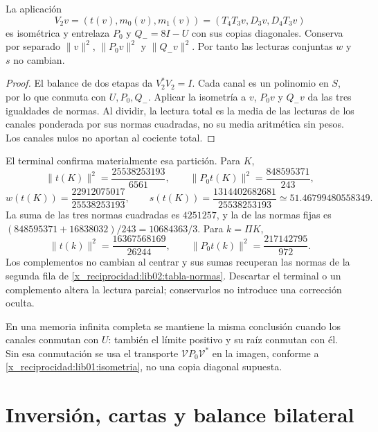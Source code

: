 \begin{proposition}
\label{x_reciprocidad:lib02:memoria-ternaria}
La aplicación
\[
 V_2v=(t(v),m_0(v),m_1(v))
 =(T_4T_3v,D_3v,D_4T_3v)
\]
es isométrica y entrelaza \(P_0\) y \(Q_-=8I-U\) con sus
copias diagonales. Conserva por separado \(\|v\|^2\),
\(\|P_0v\|^2\) y \(\|Q_-v\|^2\). Por tanto las lecturas
conjuntas \(w\) y \(s\) no cambian.
\end{proposition}
\begin{proof}
El balance de dos etapas da \(V_2^*V_2=I\). Cada canal es un
polinomio en \(S\), por lo que conmuta con \(U,P_0,Q_-\).
Aplicar la isometría a \(v\), \(P_0v\) y \(Q_-v\) da las tres
igualdades de normas. Al dividir, la lectura total es la media de las
lecturas de los canales ponderada por sus normas cuadradas, no su media
aritmética sin pesos. Los canales nulos no aportan al cociente total.
\end{proof}

El terminal confirma materialmente esa partición. Para \(K\),
\[
 \|t(K)\|^2=\frac{25538253193}{6561},\qquad
 \|P_0t(K)\|^2=\frac{848595371}{243},
\]
\[
 w(t(K))=\frac{22912075017}{25538253193},\qquad
 s(t(K))=\frac{1314402682681}{25538253193}
 \simeq51.46799480558349.
\]
La suma de las tres normas cuadradas es \(4251257\), y la de las
normas fijas es
\((848595371+16838032)/243=10684363/3\). Para \(k=\Pi K\),
\[
 \|t(k)\|^2=\frac{16367568169}{26244},\qquad
 \|P_0t(k)\|^2=\frac{217142795}{972}.
\]
Los complementos no cambian al centrar y sus sumas recuperan las normas
de la segunda fila de \eqref{x_reciprocidad:lib02:tabla-normas}. Descartar el terminal
o un complemento altera la lectura parcial; conservarlos no introduce
una corrección oculta.

En una memoria infinita completa se mantiene la misma conclusión cuando
los canales conmutan con \(U\): también el límite positivo y su raíz
conmutan con él. Sin esa conmutación se usa el transporte
\(\mathcal VP_0\mathcal V^*\) en la imagen, conforme a
\cref{x_reciprocidad:lib01:isometria}, no una copia diagonal supuesta.

\section{Inversión, cartas y balance bilateral}
\label{x_reciprocidad:lib02:bidireccional}

